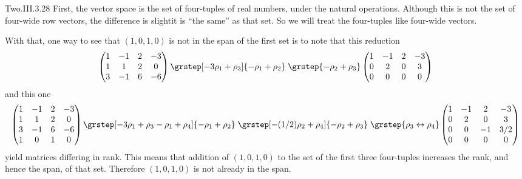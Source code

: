\begin{ans}{Two.III.3.28}
      First, the vector space is the set of four-tuples of real numbers, under
      the natural operations.
      Although this is not the set of four-wide row vectors, the difference
      is slight\Dash it is ``the same'' as that set.
      So we will treat the four-tuples like four-wide vectors.

      With that, one way to see that \( (1,0,1,0) \) is not in the span
      of the first set is to note that this reduction
      \begin{equation*}
        \begin{pmatrix}
          1  &-1  &2  &-3  \\
          1  &1   &2  &0   \\
          3  &-1  &6  &-6
        \end{pmatrix}
        \grstep[-3\rho_1+\rho_3]{-\rho_1+\rho_2}
        \;\grstep{-\rho_2+\rho_3}
        \begin{pmatrix}
          1  &-1  &2  &-3  \\
          0  &2   &0  &3   \\
          0  &0   &0  &0
        \end{pmatrix}
      \end{equation*}
      and this one
      \begin{equation*}
        \begin{pmatrix}
          1  &-1  &2  &-3  \\
          1  &1   &2  &0   \\
          3  &-1  &6  &-6  \\
          1  &0   &1  &0
        \end{pmatrix}
        \grstep[-3\rho_1+\rho_3 \\ -\rho_1+\rho_4]{-\rho_1+\rho_2}
        \;\grstep[-(1/2)\rho_2+\rho_4]{-\rho_2+\rho_3}
        \;\grstep{\rho_3\leftrightarrow\rho_4}
        \begin{pmatrix}
          1  &-1  &2  &-3  \\
          0  &2   &0  &3   \\
          0  &0   &-1 &3/2 \\
          0  &0   &0  &0
        \end{pmatrix}
      \end{equation*}
      yield matrices differing in rank.
      This means that addition of $(1,0,1,0)$ to the set of the first three
      four-tuples increases the rank, and hence the span, of that set.
      Therefore $(1,0,1,0)$ is not already in the span.
    
\end{ans}
